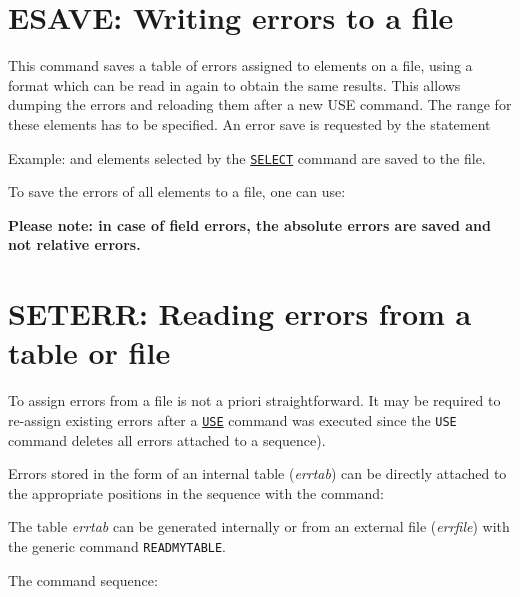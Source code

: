 %

\section{ESAVE: Writing errors to a file}
\label{sec:esave}


This command saves a table of errors assigned to elements on a file,
using a format which can be read in again to obtain the same
results. This allows dumping the errors and reloading them after a new
USE command. The range for these elements has to be specified. An error
save is requested by the statement  

Example: 
and elements selected by the  \hyperref[sec:seclect]{\tt SELECT}
command are saved to the file.  


To save the errors of all elements to a file, one can use: 

{\bf Please note: in case of field errors, the absolute errors are
  saved and not relative errors. } 

\section{SETERR: Reading errors from a table or file}
\label{Sec:seterr}

To assign errors from a file is not a priori straightforward. It may be
required to re-assign existing errors after a \hyperref[sec:use]{\tt USE}
command was executed since the {\tt USE} command deletes all errors attached to 
a sequence).

Errors stored in the form of an internal table ({\it errtab}) can  be
directly attached to the appropriate positions in the sequence with the
command:  


The table {\it errtab} can be generated internally or from an
external file ({\it errfile}) with the generic command {\tt READMYTABLE}.  
 

The command sequence: 

